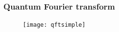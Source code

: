 \begin{frame}
	\frametitle{Quantum Fourier transform}
		\framesubtitle{}

		\begin{figure}
		\centering
			\texttt{[image: qftsimple]}
			\label{fig:qft qft}
		\end{figure}
		

\end{frame}
